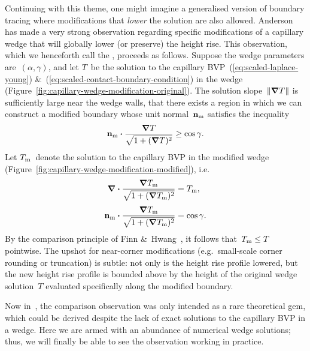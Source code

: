 Continuing with this theme,
one might imagine a generalised version of boundary tracing
where modifications that \emph{lower} the solution are also allowed.
Anderson~\cite[Section~7.3.2]{anderson-2002-thesis-boundary-tracing-pdes}
has made a very strong observation
regarding specific modifications of a capillary wedge
that will globally lower (or preserve) the height rise.
This observation,
which we henceforth call the ,
proceeds as follows.
Suppose the wedge parameters are~$(\alpha, \gamma)$,
and let $T$~be the solution
to the capillary BVP~(\ref{eq:scaled-laplace-young})
\&~(\ref{eq:scaled-contact-boundary-condition})
in the wedge (Figure~\ref{fig:capillary-wedge-modification-original}).
The solution slope~$\lVert\mathop{}\!\boldsymbol{\mathbf{\nabla}} T\rVert$
is sufficiently large near the wedge walls,
that there exists a region in which we can construct a modified boundary
whose unit normal~$\mathop{}\!\boldsymbol{\mathbf{n}}_{\mathrm{m}}$ satisfies the inequality
\begin{equation}
  \mathop{}\!\boldsymbol{\mathbf{n}}_{\mathrm{m}} \boldsymbol{\cdot} \frac{\mathop{}\!\boldsymbol{\mathbf{\nabla}} T}{\sqrt{1 + (\mathop{}\!\boldsymbol{\mathbf{\nabla}} T)^2}} \ge \cos\gamma.
  \label{eq:modification-contact-boundary-condition-inequality}
\end{equation}
Let $T_{\mathrm{m}}$~denote the solution to the capillary BVP
in the modified wedge (Figure~\ref{fig:capillary-wedge-modification-modified}),
i.e.
\begin{align}
  \del \dotp \frac{\del T_\modi}{\sqrt{1 + (\del T_\modi)^2}}
    &= T_\modi,
    \label{eq:modification-laplace-young}
    \\[\tallspace]
  \normalvec_\modi \dotp \frac{\del T_\modi}{\sqrt{1 + (\del T_\modi)^2}}
    &= \cos\gamma.
    \label{eq:modification-contact-boundary-condition}
\end{align}
By the comparison principle
of Finn \&~Hwang~\cite{finn-1989-comparison-principle-capillary-surfaces},
it follows that~$T_{\mathrm{m}} \le T$ pointwise.
The upshot for near-corner modifications
(e.g.~small-scale corner rounding or truncation)
is subtle:
not only is the height rise profile lowered,
but the new height rise profile is bounded above
by the height of the original wedge solution~$T$
evaluated specifically along the modified boundary.

Now in~\cite{anderson-2002-thesis-boundary-tracing-pdes},
the comparison observation was only intended as a rare theoretical gem,
which could be derived despite the lack of exact solutions
to the capillary BVP in a wedge.
Here we are armed with an abundance of numerical wedge solutions;
thus, we will finally be able to see the observation working in practice.

